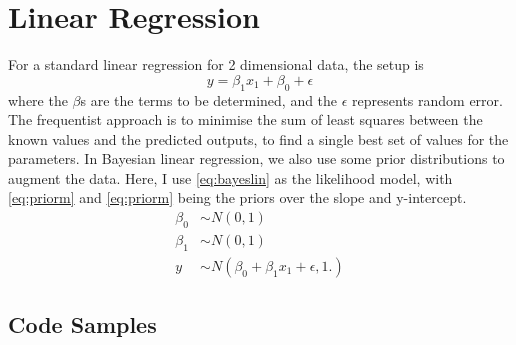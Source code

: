 \section{Linear Regression} \label{app:linreg}
For a standard linear regression for 2 dimensional data, the setup is 
\[y=\beta_1 x_1 + \beta_0 + \epsilon \]
where the $\beta$s are the terms to be determined, and the $\epsilon$ represents random error. The frequentist approach is to minimise the sum of least squares between the known values and the predicted outputs, to find a single best set of values for the parameters. In Bayesian linear regression, we also use some prior distributions to augment the data. Here, I use \eqref{eq:bayeslin} as the likelihood model, with \eqref{eq:priorm} and \eqref{eq:priorm} being the priors over the slope and y-intercept.
\begin{align}
	\beta_0 & \sim N(0,1)\label{eq:priorm}                                    \\
	\beta_1 & \sim N(0,1)\label{eq:priorc}                                    \\
	y       & \sim N(\beta_0 + \beta_1 x_1 + \epsilon, 1.)\label{eq:bayeslin} 
\end{align}

\FloatBarrier
\subsection{Code Samples}
\begin{figure}[!ht]
	\begin{minipage}{0.5\linewidth}
	\end{minipage}
	\begin{minipage}{0.5\linewidth}
	\end{minipage}
\end{figure}
\FloatBarrier





